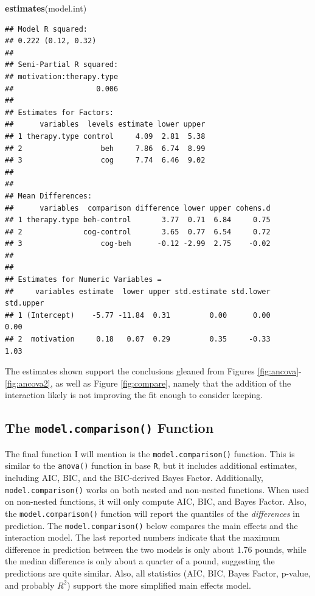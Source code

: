 \documentclass[
  doc]{apa6}
\newenvironment{Shaded}{\begin{snugshade}}{\end{snugshade}}
\newcommand{\KeywordTok}[1]{\textcolor[rgb]{0.13,0.29,0.53}{\textbf{#1}}}
\newcommand{\NormalTok}[1]{#1}
\begin{document}
\begin{Shaded}
\begin{Highlighting}[]
\KeywordTok{estimates}\NormalTok{(model.int)}
\end{Highlighting}
\end{Shaded}

\begin{verbatim}
## Model R squared:
## 0.222 (0.12, 0.32)
## 
## Semi-Partial R squared:
## motivation:therapy.type 
##                   0.006 
## 
## Estimates for Factors:
##      variables  levels estimate lower upper
## 1 therapy.type control     4.09  2.81  5.38
## 2                  beh     7.86  6.74  8.99
## 3                  cog     7.74  6.46  9.02
## 
## 
## Mean Differences:
##      variables  comparison difference lower upper cohens.d
## 1 therapy.type beh-control       3.77  0.71  6.84     0.75
## 2              cog-control       3.65  0.77  6.54     0.72
## 3                  cog-beh      -0.12 -2.99  2.75    -0.02
## 
## 
## Estimates for Numeric Variables = 
##     variables estimate  lower upper std.estimate std.lower std.upper
## 1 (Intercept)    -5.77 -11.84  0.31         0.00      0.00      0.00
## 2  motivation     0.18   0.07  0.29         0.35     -0.33      1.03
\end{verbatim}

The estimates shown support the conclusions gleaned from Figures \ref{fig:ancova}-\ref{fig:ancova2}, as well as Figure \ref{fig:compare}, namely that the addition of the interaction likely is not improving the fit enough to consider keeping.

\hypertarget{the-model.comparison-function}{%
\subsection{\texorpdfstring{The \texttt{model.comparison()} Function}{The model.comparison() Function}}\label{the-model.comparison-function}}

The final function I will mention is the \texttt{model.comparison()} function. This is similar to the \texttt{anova()} function in base \texttt{R}, but it includes additional estimates, including AIC, BIC, and the BIC-derived Bayes Factor. Additionally, \texttt{model.comparison()} works on both nested and non-nested functions. When used on non-nested functions, it will only compute AIC, BIC, and Bayes Factor. Also, the \texttt{model.comparison()} function will report the quantiles of the \emph{differences} in prediction. The \texttt{model.comparison()} below compares the main effects and the interaction model. The last reported numbers indicate that the maximum difference in prediction between the two models is only about 1.76 pounds, while the median difference is only about a quarter of a pound, suggesting the predictions are quite similar. Also, all statistics (AIC, BIC, Bayes Factor, p-value, and probably \(R^2\)) support the more simplified main effects model.
\end{document}
